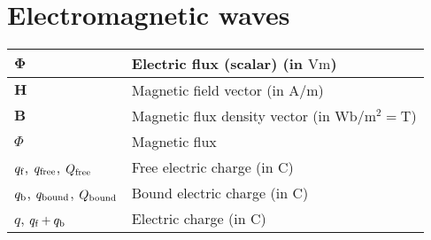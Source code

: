 \section{Electromagnetic waves}
\begin{xltabular}{\textwidth}{XX}
	\(\mathbf{\Phi}\)                                                                                                                        & Electric flux (scalar) (in \(\si{\volt\meter}\))                                                                                                                                         \\ \hline
	\(\mathbf{H}\)                                                                                                                           & Magnetic field vector (in \(\si{\ampere\per\meter}\))                                                                                                                                    \\ \hline
	\(\mathbf{B}\)                                                                                                                           & Magnetic flux density vector (in \(\si{\weber\per\meter\squared} = \si{\tesla}\))                                                                                                        \\ \hline
	\(\Phi\)\cite{chengFieldWaveElectromagnetics1989}                                                                                        & Magnetic flux                                                                                                                                                                            \\ \hline
	\(q_{\textnormal{f}}\), \(q_{\textnormal{free}}\), \(Q_{\textnormal{free}}\)\cite{wiki:D-field-flux}                                     & Free electric charge (in \(\si{\coulomb}\))                                                                                                                                              \\ \hline
	\(q_{\textnormal{b}}\), \(q_{\textnormal{bound}}\), \(Q_{\textnormal{bound}}\)\cite{wiki:D-field-flux}                                   & Bound electric charge (in \(\si{\coulomb}\))                                                                                                                                             \\ \hline
	\(q\), \(q_{\textnormal{f}}+q_{\textnormal{b}}\)                                                                                         & Electric charge (in \(\si{\coulomb}\))                                                                                                                                                   \\ \hline

\end{xltabular}
